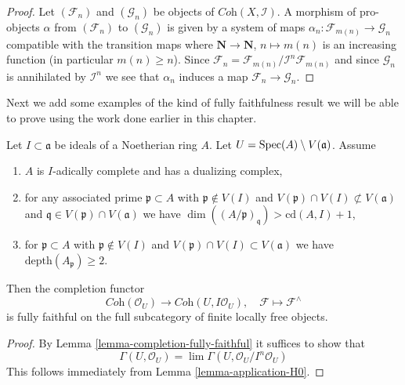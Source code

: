 \begin{proof}
Let $(\mathcal{F}_n)$ and $(\mathcal{G}_n)$ be objects of
$\textit{Coh}(X, \mathcal{I})$. A morphism of pro-objects
$\alpha$ from $(\mathcal{F}_n)$ to $(\mathcal{G}_n)$ is given
by a system of maps
$\alpha_n : \mathcal{F}_{m(n)} \to \mathcal{G}_n$ compatible with
the transition maps where $\mathbf{N} \to \mathbf{N}$, $n \mapsto m(n)$
is an increasing function (in particular $m(n) \geq n$). Since
$\mathcal{F}_n = \mathcal{F}_{m(n)}/\mathcal{I}^n\mathcal{F}_{m(n)}$
and since $\mathcal{G}_n$ is annihilated by $\mathcal{I}^n$
we see that $\alpha_n$ induces a map $\mathcal{F}_n \to \mathcal{G}_n$.
\end{proof}

\noindent
Next we add some examples of the kind of fully faithfulness
result we will be able to prove using the work done earlier in this chapter.

\begin{lemma}
\label{lemma-fully-faithful}
Let $I \subset \mathfrak a$ be ideals of a Noetherian ring $A$.
Let $U = \mathop{\mathrm{Spec}}(A) \setminus V(\mathfrak a)$. Assume
\begin{enumerate}
\item $A$ is $I$-adically complete and has a dualizing complex,
\item for any associated prime $\mathfrak p \subset A$ with
$\mathfrak p \not \in V(I)$ and
$V(\mathfrak p) \cap V(I) \not \subset V(\mathfrak a)$ and
$\mathfrak q \in V(\mathfrak p) \cap V(\mathfrak a)$ we have
$\dim((A/\mathfrak p)_\mathfrak q) > \text{cd}(A, I) + 1$,
\item for $\mathfrak p \subset A$ with $\mathfrak p \not \in V(I)$
and $V(\mathfrak p) \cap V(I) \subset V(\mathfrak a)$
we have $\text{depth}(A_\mathfrak p) \geq 2$.
\end{enumerate}
Then the completion functor
$$
\textit{Coh}(\mathcal{O}_U)
\longrightarrow
\textit{Coh}(U, I\mathcal{O}_U),
\quad
\mathcal{F} \longmapsto \mathcal{F}^\wedge
$$
is fully faithful on the full subcategory of
finite locally free objects.
\end{lemma}

\begin{proof}
By Lemma \ref{lemma-completion-fully-faithful}
it suffices to show that
$$
\Gamma(U, \mathcal{O}_U) =
\lim \Gamma(U, \mathcal{O}_U/I^n\mathcal{O}_U)
$$
This follows immediately from
Lemma \ref{lemma-application-H0}.
\end{proof}

